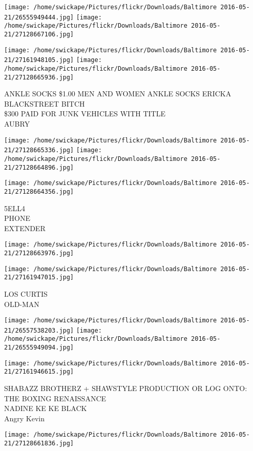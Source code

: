 \documentclass[10pt,letterpaper]{article}
\begin{document}
\texttt{[image: /home/swickape/Pictures/flickr/Downloads/Baltimore 2016-05-21/26555949444.jpg]}
\texttt{[image: /home/swickape/Pictures/flickr/Downloads/Baltimore 2016-05-21/27128667106.jpg]}

\texttt{[image: /home/swickape/Pictures/flickr/Downloads/Baltimore 2016-05-21/27161948105.jpg]}
\texttt{[image: /home/swickape/Pictures/flickr/Downloads/Baltimore 2016-05-21/27128665936.jpg]}

ANKLE SOCKS \$1.00 MEN AND WOMEN ANKLE SOCKS ERICKA\\
BLACKSTREET BITCH\\
\$300 PAID FOR JUNK VEHICLES WITH TITLE\\
AUBRY
\pagebreak

\texttt{[image: /home/swickape/Pictures/flickr/Downloads/Baltimore 2016-05-21/27128665336.jpg]}
\texttt{[image: /home/swickape/Pictures/flickr/Downloads/Baltimore 2016-05-21/27128664896.jpg]}

\texttt{[image: /home/swickape/Pictures/flickr/Downloads/Baltimore 2016-05-21/27128664356.jpg]}

5ELL4\\
PHONE\\
EXTENDER
\pagebreak

\texttt{[image: /home/swickape/Pictures/flickr/Downloads/Baltimore 2016-05-21/27128663976.jpg]}

\vspace{0.25in}
\texttt{[image: /home/swickape/Pictures/flickr/Downloads/Baltimore 2016-05-21/27161947015.jpg]}

LOS CURTIS\\
OLD{-}MAN
\pagebreak

\texttt{[image: /home/swickape/Pictures/flickr/Downloads/Baltimore 2016-05-21/26557538203.jpg]}
\texttt{[image: /home/swickape/Pictures/flickr/Downloads/Baltimore 2016-05-21/26555949094.jpg]}

\texttt{[image: /home/swickape/Pictures/flickr/Downloads/Baltimore 2016-05-21/27161946615.jpg]}

SHABAZZ BROTHERZ + SHAWSTYLE PRODUCTION OR LOG ONTO: THE BOXING RENAISSANCE\\
NADINE KE KE BLACK\\
Angry Kevin
\pagebreak

\texttt{[image: /home/swickape/Pictures/flickr/Downloads/Baltimore 2016-05-21/27128661836.jpg]}
\end{document}

